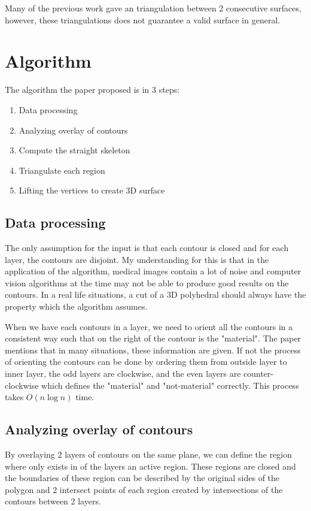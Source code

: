 \documentclass[11pt]{article}
\begin{document}
Many of the previous work gave an triangulation between 2 consecutive surfaces, however, these triangulations does not guarantee a valid surface in general.

\section{Algorithm}

The algorithm the paper proposed is in 3 steps:

\begin{enumerate}
    \item Data processing
    \item Analyzing overlay of contours
    \item Compute the straight skeleton 
    \item Triangulate each region
    \item Lifting the vertices to create 3D surface
\end{enumerate}

\subsection{Data processing}
The only assumption for the input is that each contour is closed and for each layer, the contours are disjoint. My understanding for this is that in the application of the algorithm, medical images contain a lot of noise and computer vision algorithms at the time may not be able to produce good results on the contours. In a real life situations, a cut of a 3D polyhedral should always have the property which the algorithm assumes.

When we have each contours in a layer, we need to orient all the contours in a consistent way such that on the right of the contour is the "material". The paper mentions that in many situations, these information are given. If not the process of orienting the contours can be done by ordering them from outside layer to inner layer, the odd layers are clockwise, and the even layers are counter-clockwise which defines the "material" and "not-material" correctly. This process takes $O(n\log n)$ time.

\subsection{Analyzing overlay of contours}

By overlaying 2 layers of contours on the same plane, we can define the region where only exists in of the layers an active region. These regions are closed and the boundaries of these region can be described by the original sides of the polygon and 2 intersect points of each region created by intersections of the contours between 2 layers.
\end{document}
